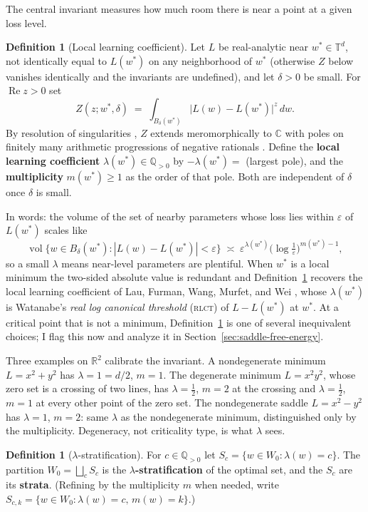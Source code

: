 \documentclass[11pt]{amsart}
\theoremstyle{plain}
\theoremstyle{definition}
\newtheorem{definition}[theorem]{Definition}
\newcommand{\R}{\mathbb{R}}
\newcommand{\Q}{\mathbb{Q}}
\newcommand{\T}{\mathbb{T}}
\newcommand{\vol}{\operatorname{vol}}
\begin{document}
The central invariant measures how much room there is near a point at a given loss level.

\begin{definition}[Local learning coefficient]\label{def:llc}
Let $L$ be real-analytic near $w^* \in \T^d$, not identically equal to $L(w^*)$ on any neighborhood of $w^*$ (otherwise $Z$ below vanishes identically and the invariants are undefined), and let $\delta > 0$ be small. For $\operatorname{Re} z > 0$ set
\[
   Z(z; w^*, \delta) \;=\; \int_{B_\delta(w^*)} \bigl| L(w) - L(w^*) \bigr|^{z} \, dw .
\]
By resolution of singularities \cite{hironaka1964}, $Z$ extends meromorphically to $\mathbb{C}$ with poles on finitely many arithmetic progressions of negative rationals \cite{agv1988,saito2007}. Define the \textbf{local learning coefficient} $\lambda(w^*) \in \Q_{>0}$ by $-\lambda(w^*) = $ (largest pole), and the \textbf{multiplicity} $m(w^*) \ge 1$ as the order of that pole. Both are independent of $\delta$ once $\delta$ is small.
\end{definition}

In words: the volume of the set of nearby parameters whose loss lies within $\varepsilon$ of $L(w^*)$ scales like
\[
   \vol \bigl\{ w \in B_\delta(w^*) : |L(w) - L(w^*)| < \varepsilon \bigr\}
   \;\asymp\; \varepsilon^{\lambda(w^*)} \bigl( \log \tfrac1\varepsilon \bigr)^{m(w^*) - 1},
\]
so a small $\lambda$ means near-level parameters are plentiful. When $w^*$ is a local minimum the two-sided absolute value is redundant and Definition~\ref{def:llc} recovers the local learning coefficient of Lau, Furman, Wang, Murfet, and Wei \cite{lau2023}, whose $\lambda(w^*)$ is Watanabe's \emph{real log canonical threshold} (\textsc{rlct}) of $L - L(w^*)$ at $w^*$. At a critical point that is not a minimum, Definition~\ref{def:llc} is one of several inequivalent choices; I flag this now and analyze it in Section~\ref{sec:saddle-free-energy}.

Three examples on $\R^2$ calibrate the invariant. A nondegenerate minimum $L = x^2 + y^2$ has $\lambda = 1 = d/2$, $m = 1$. The degenerate minimum $L = x^2 y^2$, whose zero set is a crossing of two lines, has $\lambda = \tfrac12$, $m = 2$ at the crossing and $\lambda = \tfrac12$, $m = 1$ at every other point of the zero set. The nondegenerate saddle $L = x^2 - y^2$ has $\lambda = 1$, $m = 2$: same $\lambda$ as the nondegenerate minimum, distinguished only by the multiplicity. Degeneracy, not criticality type, is what $\lambda$ sees.

\begin{definition}[$\lambda$-stratification]\label{def:strat}
For $c \in \Q_{>0}$ let $S_c = \{ w \in W_0 : \lambda(w) = c \}$. The partition $W_0 = \bigsqcup_c S_c$ is the \textbf{$\lambda$-stratification} of the optimal set, and the $S_c$ are its \textbf{strata}. (Refining by the multiplicity $m$ when needed, write $S_{c,k} = \{ w \in W_0 : \lambda(w) = c, \, m(w) = k \}$.)
\end{definition}
\end{document}
